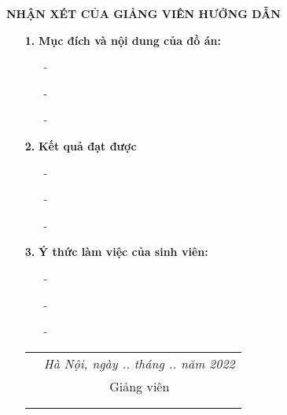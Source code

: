 \thisfancypage{
	\fbox
}{}
\newpage
\begin{center}
	\textbf{NHẬN XÉT CỦA GIẢNG VIÊN HƯỚNG DẪN}
\end{center}
\begin{enumerate}
	\item [{\bfseries 1.}]{\bfseries Mục đích và nội dung của đồ án:}
	\begin{enumerate}
		\item[-] 
		\item[-] 
		\item[-] 
	\end{enumerate}
	\item [{\bfseries 2.}] {\bfseries Kết quả đạt được} 
	\begin{enumerate}
		\item[-] 
		\item[-] 
		\item[-] 
	\end{enumerate}
	\item [{\bfseries 3.}]{\bfseries Ý thức làm việc của sinh viên:}
	\begin{enumerate}
		\item[-]
		\item[-]
		\item[-]
	\end{enumerate}
	\begin{flushright}
		\begin{tabular}{lc}
			& \textit{Hà Nội, ngày .. tháng .. năm 2022}\\
			& Giảng viên\\
			& \\
			& \textbf{\INSTRUCTOR}\\
		\end{tabular}
	\end{flushright}
\end{enumerate}
\newpage